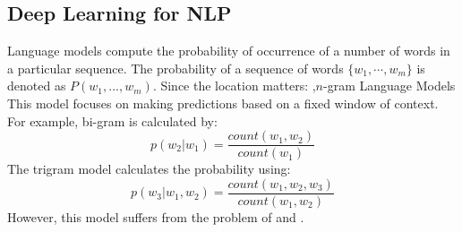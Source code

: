 \documentclass[10pt]{report}
\begin{document}
\subsection{Deep Learning for NLP}

Language models compute the probability of occurrence of a number of words in a particular sequence. The probability of a sequence of words $\{w_1,\cdots,w_m\}$ is denoted as $P(w_1,...,w_m)$. Since the location matters:
\sep{$n$-gram Language Models}
This model focuses on making predictions based on a fixed window of context. For example, bi-gram is calculated by:
\[
    p(w_2|w_1)=\frac{count(w_1,w_2)}{count(w_1)}
\]
The trigram model calculates the probability using:
\[p(w_3|w_1,w_2)=\frac{count(w_1,w_2,w_3)}{count(w_1,w_2)}\]
However, this model suffers from the problem of  and .
\end{document}
